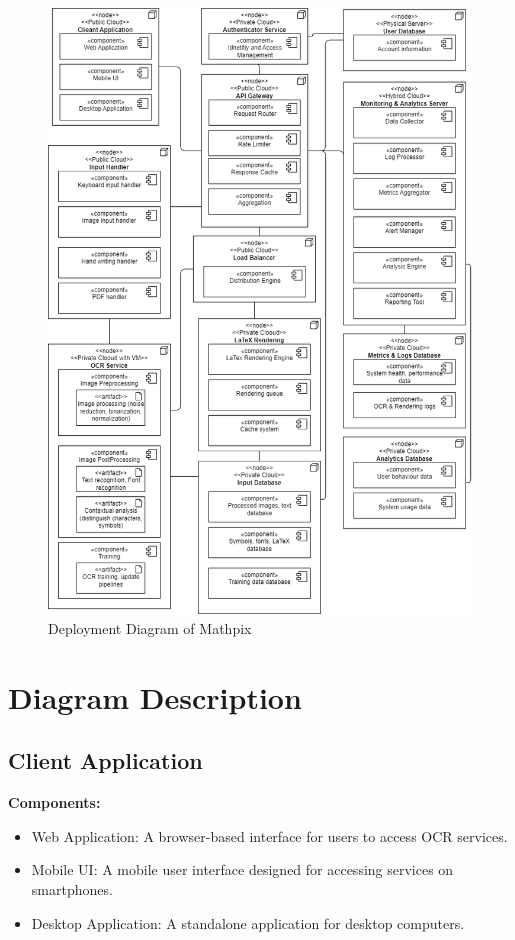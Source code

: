 \documentclass{article}
\begin{document}
\begin{figure}[H]
    \centering
    \includegraphics[width=\textwidth]{deployment_diagram.png}
    \caption{Deployment Diagram of Mathpix}
    \label{fig:Deployment Diagram of Mathpix}
\end{figure}

\section{Diagram Description}
\subsection{Client Application}
\textbf{Components:}
\begin{itemize}
    \item Web Application: A browser-based interface for users to access OCR services.
    \item Mobile UI: A mobile user interface designed for accessing services on smartphones.
    \item Desktop Application: A standalone application for desktop computers.
\end{itemize}
\end{document}
